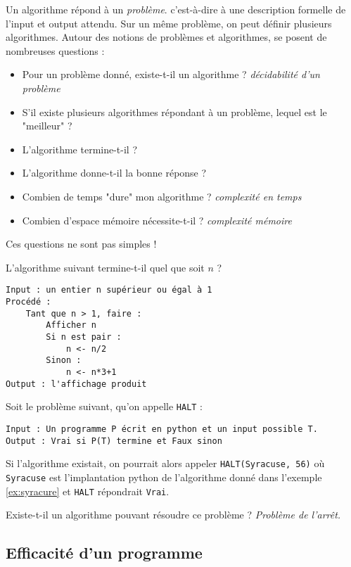 \documentclass{../cours}
\begin{document}
Un algorithme répond à un \emph{problème}. c'est-à-dire à une description formelle de l'input et output attendu. Sur un même problème, on peut définir plusieurs algorithmes. Autour des notions de problèmes et algorithmes, se posent de nombreuses questions :
\begin{itemize}
\item Pour un problème donné, existe-t-il un algorithme ? \emph{décidabilité d'un problème}
\item S'il existe plusieurs algorithmes répondant à un problème, lequel est le "meilleur" ?
\item L'algorithme termine-t-il ?
\item L'algorithme donne-t-il la bonne réponse ?
\item Combien de temps "dure" mon algorithme ? \emph{complexité en temps}
\item Combien d'espace mémoire nécessite-t-il ? \emph{complexité mémoire}
\end{itemize}

Ces questions ne sont pas simples !

\begin{Example}[Syracuse]
\label{ex:syracure}
L'algorithme suivant termine-t-il quel que soit $n$ ?

\begin{lstlisting}
Input : un entier n supérieur ou égal à 1
Procédé :
    Tant que n > 1, faire :
        Afficher n
        Si n est pair :
            n <- n/2
        Sinon :
            n <- n*3+1 
Output : l'affichage produit
\end{lstlisting}
\end{Example}

\begin{Example}
Soit le problème suivant, qu'on appelle \lstinline{HALT} :
\begin{lstlisting}
Input : Un programme P écrit en python et un input possible T.
Output : Vrai si P(T) termine et Faux sinon
\end{lstlisting}

Si l'algorithme existait, on pourrait alors appeler \lstinline{HALT(Syracuse, 56)} où \lstinline{Syracuse} est l'implantation python de l'algorithme donné dans l'exemple \ref{ex:syracure} et \lstinline{HALT} répondrait \lstinline{Vrai}.

Existe-t-il un algorithme pouvant résoudre ce problème ? \emph{Problème de l'arrêt.}
\end{Example}

\subsection{Efficacité d'un programme}
\label{sub-sec:efficacite}
\end{document}

